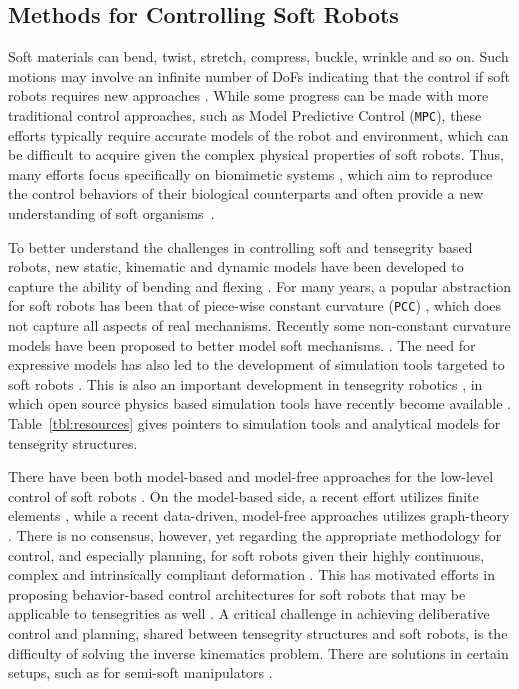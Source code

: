 \subsection{Methods for Controlling Soft Robots}

Soft materials can bend, twist, stretch, compress, buckle, wrinkle and
so on. Such motions may involve an infinite number of DoFs indicating
that the control if soft robots requires new approaches
\cite{Rus:2015aa, Trimmer:2014aa}. While some progress can 
be made with more traditional control approaches, such as Model
Predictive Control ({\tt MPC}), these efforts typically require
accurate models of the robot and environment, which can be difficult
to acquire given the complex physical properties of soft robots.
Thus, many efforts focus specifically on biomimetic
systems \cite{Kim:2013aa}, which aim to reproduce the control
behaviors of their biological counterparts and often provide a new
understanding of soft organisms~\cite{Lin:2011aa}.


To better understand the challenges in controlling soft and tensegrity
based robots, new static, kinematic and dynamic models have been
developed to capture the ability of bending and flexing
\cite{Saunders:2011aa, skelton_tensegrity_2009}.  For many
years, a popular abstraction for soft robots has been that of
piece-wise constant curvature ({\tt PCC})
\cite{Webster:2010aa}, which does not
capture all aspects of real mechanisms. Recently some non-constant
curvature models have been proposed to better model soft mechanisms.
\cite{Renda:2014aa}.  The need for
expressive models has also led to the development of simulation tools
targeted to soft robots \cite{Germann:2013aa}. This is also an
important development in tensegrity
robotics \cite{Caluwaerts2013rsif}, in which open source physics based
simulation tools have recently become
available \cite{SunSpiralSoftware}.  Table~\ref{tbl:resources} gives
pointers to simulation tools and analytical models for tensegrity
structures.

There have been both model-based and model-free approaches for the
low-level control of soft robots \cite{Rigatos:2009aa}. On the
model-based side, a recent effort utilizes finite
elements \cite{Largilliere:2015aa}, while a recent data-driven,
model-free approaches utilizes graph-theory \cite{Vikas:2015aa}.
There is no consensus, however, yet regarding the appropriate
methodology for control, and especially planning, for soft robots
given their highly continuous, complex and intrinsically compliant
deformation \cite{Rus:2015aa}.  This has motivated efforts in
proposing behavior-based control architectures for soft robots that
may be applicable to tensegrities as well \cite{Armbrust:2015aa}.  A
critical challenge in achieving deliberative control and planning,
shared between tensegrity structures and soft robots, is the
difficulty of solving the inverse kinematics problem. There are
solutions in certain setups, such as for semi-soft
manipulators \cite{Neppalli:2009aa}.

